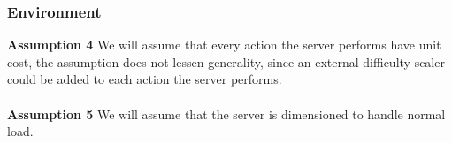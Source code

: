 \subsubsection{Environment}
\noindent \textbf{Assumption 4} \indent We will assume that every action the server performs have unit cost, the assumption does not lessen generality, since an external difficulty scaler could be added to each action the server performs.
\\
\\
\noindent \textbf{Assumption 5} \indent We will assume that the server is dimensioned to handle normal load.